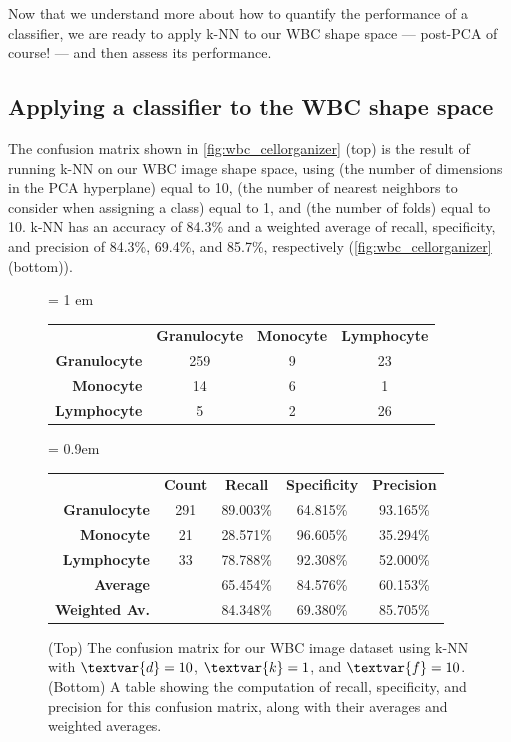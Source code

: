 Now that we understand more about how to quantify the performance of a classifier, we are ready to apply k-NN to our WBC shape space --- post-PCA of course! --- and then assess its performance.

\FloatBarrier
{}
\subsection{Applying a classifier to the WBC shape space}

The confusion matrix shown in \autoref{fig:wbc_cellorganizer} (top) is the result of running k-NN on our WBC image shape space, using  (the number of dimensions in the PCA hyperplane) equal to 10,  (the number of nearest neighbors to consider when assigning a class) equal to 1, and  (the number of folds) equal to 10. k-NN has an accuracy of 84.3\% and a weighted average of recall, specificity, and precision of 84.3\%, 69.4\%, and 85.7\%, respectively (\autoref{fig:wbc_cellorganizer} (bottom)).

\begin{figure}[h]
\centering
\tabcolsep = 1 em
\mySfFamily
\begin{tabular}{r c c c}
\rowcolor{gray!50}
& \textbf{Granulocyte} & \textbf{Monocyte} & \textbf{Lymphocyte} \\
\textbf{Granulocyte} & 259 & 9 & 23 \\
\textbf{Monocyte} & \phantom{5}14 & 6 & \phantom{5}1 \\
 \textbf{Lymphocyte} & \phantom{55}5 & 2 & 26
\end{tabular}

\phantom{Test}\vspace{\baselineskip}

\tabcolsep = 0.9em
\begin{tabular}{r c c c c}
\rowcolor{gray!50}
& \textbf{Count} & \textbf{Recall} & \textbf{Specificity} & \textbf{Precision} \\
\textbf{Granulocyte} & 291 & 89.003\% & 64.815\% & 93.165\%\\
\textbf{Monocyte} & 21 & 28.571\% & 96.605\% & 35.294\% \\
\textbf{Lymphocyte} & 33 & 78.788\% & 92.308\% & 52.000\%\\
\textbf{Average} & & 65.454\% & 84.576\% & 60.153\%\\
\textbf{Weighted Av.} & & 84.348\% & 69.380\% & 85.705\%\\
\end{tabular}
\caption{(Top) The confusion matrix for our WBC image dataset using k-NN with $\textvar{d} = \text{10}$, $\textvar{k} = \text{1}$, and $\textvar{f} = \text{10}$. (Bottom) A table showing the computation of recall, specificity, and precision for this confusion matrix, along with their averages and weighted averages.}
\label{fig:wbc_cellorganizer}
\end{figure}

